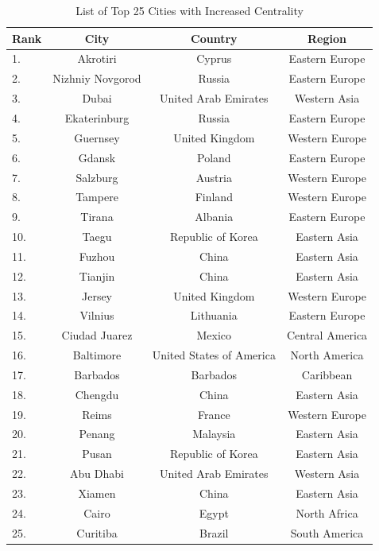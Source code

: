 \begin{table}[ht]
	\centering
	\caption{List of Top 25 Cities with Increased Centrality}
	\begin{scriptsize}
	\begin{tabular}{|l|c|c|c|}
	\hline \textbf{Rank} & \textbf{City} & \textbf{Country} & \textbf{Region}  			\\   
	\hline 
	 1. & Akrotiri      	& Cyprus 							& Eastern Europe 		\\	
	 2. & Nizhniy Novgorod  & Russia		 					& Eastern Europe  		\\	
	 3. & Dubai 			& United Arab Emirates				& Western Asia	 		\\	
	 4. & Ekaterinburg 		& Russia		 					& Eastern Europe  		\\	
	 5. & Guernsey 			& United Kingdom 					& Western Europe 		\\	
	 6. & Gdansk			& Poland				 			& Eastern Europe  		\\	
	 7. & Salzburg 			& Austria 							& Western Europe 		\\		
	 8. & Tampere 			& Finland			 				& Western Europe		\\	
	 9. & Tirana 			& Albania				 			& Eastern Europe 		\\	
	 10. & Taegu 			& Republic of Korea					& Eastern Asia			\\	
	 11. & Fuzhou 			& China 							& Eastern Asia			\\	
	 12. & Tianjin	 		& China					 			& Eastern Asia			\\	
	 13. & Jersey	 		& United Kingdom					& Western Europe  		\\	
	 14. & Vilnius	 		& Lithuania			 				& Eastern Europe		\\ 
	 15. & Ciudad Juarez 	& Mexico	 						& Central America		\\ 				
	 16. & Baltimore		& United States of America  		& North America    		\\ 
	 17. & Barbados		 	& Barbados		 					& Caribbean		  		\\
	 18. & Chengdu 			& China	  							& Eastern Asia   		\\
	 19. & Reims 			& France 							& Western Europe   		\\
	 20. & Penang	 		& Malaysia			 				& Eastern Asia			\\	
	 21. & Pusan	 		& Republic of Korea					& Eastern Asia			\\	
	 22. & Abu Dhabi		& United Arab Emirates		  		& Western Asia	 		\\
	 23. & Xiamen	 		& China						  		& Eastern Asia	 		\\
	 24. & Cairo	 		& Egypt						  		& North Africa   		\\
	 25. & Curitiba			& Brazil  							& South America   		\\
	\hline
	\end{tabular} 
	\end{scriptsize}
	\label{tab:appendix-B-centrality-increasing}
\end{table}


